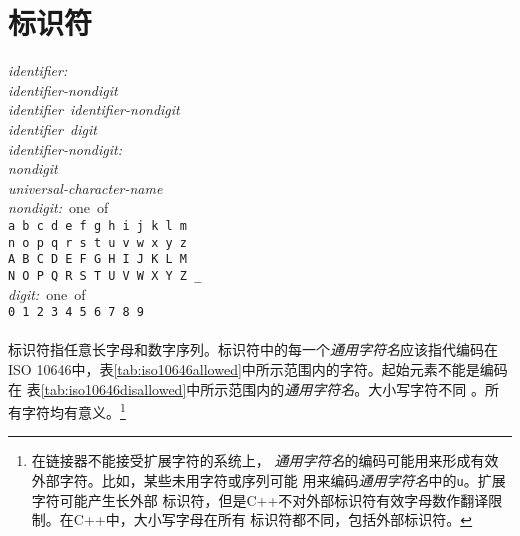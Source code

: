 \section{标识符}
\noindent \mbox{\qquad \textit{identifier:}}                                  \\
\mbox{\qquad \qquad \textit{identifier-nondigit}}                             \\
\mbox{\qquad \qquad \textit{identifier identifier-nondigit}}                  \\
\mbox{\qquad \qquad \textit{identifier digit}}                                \\
\noindent \mbox{\qquad \textit{identifier-nondigit:}}                         \\
\mbox{\qquad \qquad \textit{nondigit}}                                        \\
\mbox{\qquad \qquad \textit{universal-character-name}}                        \\
\noindent \mbox{\qquad \textit{nondigit:} one of}                             \\
\mbox{\qquad \qquad \texttt{a b c d e f g h i j k l m}}                       \\
\mbox{\qquad \qquad \texttt{n o p q r s t u v w x y z}}                       \\
\mbox{\qquad \qquad \texttt{A B C D E F G H I J K L M}}                       \\
\mbox{\qquad \qquad \texttt{N O P Q R S T U V W X Y Z \_}}                    \\
\noindent \mbox{\qquad \textit{digit:} one of}                                \\
\mbox{\qquad \qquad \texttt{0 1 2 3 4 5 6 7 8 9}}

\paragraph{}
标识符指任意长字母和数字序列。标识符中的每一个\textit{通用字符名}应该指代编码在
ISO 10646中，表\ref{tab:iso10646allowed}中所示范围内的字符。起始元素不能是编码在
表\ref{tab:iso10646disallowed}中所示范围内的\textit{通用字符名}。大小写字符不同
。所有字符均有意义。\footnote{在链接器不能接受扩展字符的系统上，
\textit{通用字符名}的编码可能用来形成有效外部字符。比如，某些未用字符或序列可能
用来编码\textit{通用字符名}中的\texttt{\bslh u}。扩展字符可能产生长外部
标识符，但是C++不对外部标识符有效字母数作翻译限制。在C++中，大小写字母在所有
标识符都不同，包括外部标识符。}

